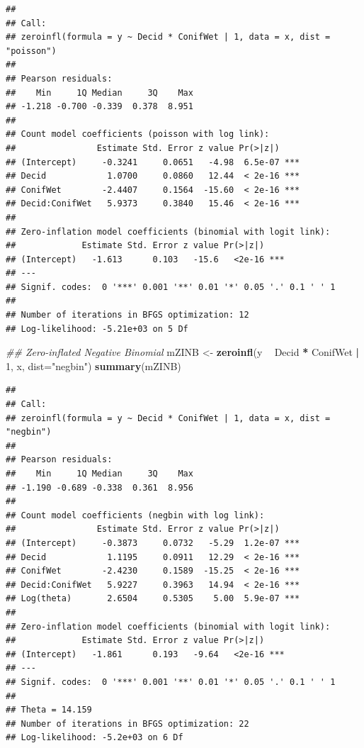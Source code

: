 \documentclass[12pt,]{book}
\newenvironment{Shaded}{\begin{snugshade}}{\end{snugshade}}
\newcommand{\CommentTok}[1]{\textcolor[rgb]{0.56,0.35,0.01}{\textit{#1}}}
\newcommand{\DataTypeTok}[1]{\textcolor[rgb]{0.13,0.29,0.53}{#1}}
\newcommand{\DecValTok}[1]{\textcolor[rgb]{0.00,0.00,0.81}{#1}}
\newcommand{\KeywordTok}[1]{\textcolor[rgb]{0.13,0.29,0.53}{\textbf{#1}}}
\newcommand{\NormalTok}[1]{#1}
\newcommand{\OperatorTok}[1]{\textcolor[rgb]{0.81,0.36,0.00}{\textbf{#1}}}
\newcommand{\StringTok}[1]{\textcolor[rgb]{0.31,0.60,0.02}{#1}}
\begin{document}
\begin{verbatim}
## 
## Call:
## zeroinfl(formula = y ~ Decid * ConifWet | 1, data = x, dist = "poisson")
## 
## Pearson residuals:
##    Min     1Q Median     3Q    Max 
## -1.218 -0.700 -0.339  0.378  8.951 
## 
## Count model coefficients (poisson with log link):
##                Estimate Std. Error z value Pr(>|z|)    
## (Intercept)     -0.3241     0.0651   -4.98  6.5e-07 ***
## Decid            1.0700     0.0860   12.44  < 2e-16 ***
## ConifWet        -2.4407     0.1564  -15.60  < 2e-16 ***
## Decid:ConifWet   5.9373     0.3840   15.46  < 2e-16 ***
## 
## Zero-inflation model coefficients (binomial with logit link):
##             Estimate Std. Error z value Pr(>|z|)    
## (Intercept)   -1.613      0.103   -15.6   <2e-16 ***
## ---
## Signif. codes:  0 '***' 0.001 '**' 0.01 '*' 0.05 '.' 0.1 ' ' 1 
## 
## Number of iterations in BFGS optimization: 12 
## Log-likelihood: -5.21e+03 on 5 Df
\end{verbatim}

\begin{Shaded}
\begin{Highlighting}[]
\CommentTok{## Zero-inflated Negative Binomial}
\NormalTok{mZINB <-}\StringTok{ }\KeywordTok{zeroinfl}\NormalTok{(y }\OperatorTok{~}\StringTok{ }\NormalTok{Decid }\OperatorTok{*}\StringTok{ }\NormalTok{ConifWet }\OperatorTok{|}\StringTok{ }\DecValTok{1}\NormalTok{, x, }\DataTypeTok{dist=}\StringTok{"negbin"}\NormalTok{)}
\KeywordTok{summary}\NormalTok{(mZINB)}
\end{Highlighting}
\end{Shaded}

\begin{verbatim}
## 
## Call:
## zeroinfl(formula = y ~ Decid * ConifWet | 1, data = x, dist = "negbin")
## 
## Pearson residuals:
##    Min     1Q Median     3Q    Max 
## -1.190 -0.689 -0.338  0.361  8.956 
## 
## Count model coefficients (negbin with log link):
##                Estimate Std. Error z value Pr(>|z|)    
## (Intercept)     -0.3873     0.0732   -5.29  1.2e-07 ***
## Decid            1.1195     0.0911   12.29  < 2e-16 ***
## ConifWet        -2.4230     0.1589  -15.25  < 2e-16 ***
## Decid:ConifWet   5.9227     0.3963   14.94  < 2e-16 ***
## Log(theta)       2.6504     0.5305    5.00  5.9e-07 ***
## 
## Zero-inflation model coefficients (binomial with logit link):
##             Estimate Std. Error z value Pr(>|z|)    
## (Intercept)   -1.861      0.193   -9.64   <2e-16 ***
## ---
## Signif. codes:  0 '***' 0.001 '**' 0.01 '*' 0.05 '.' 0.1 ' ' 1 
## 
## Theta = 14.159 
## Number of iterations in BFGS optimization: 22 
## Log-likelihood: -5.2e+03 on 6 Df
\end{verbatim}
\end{document}

